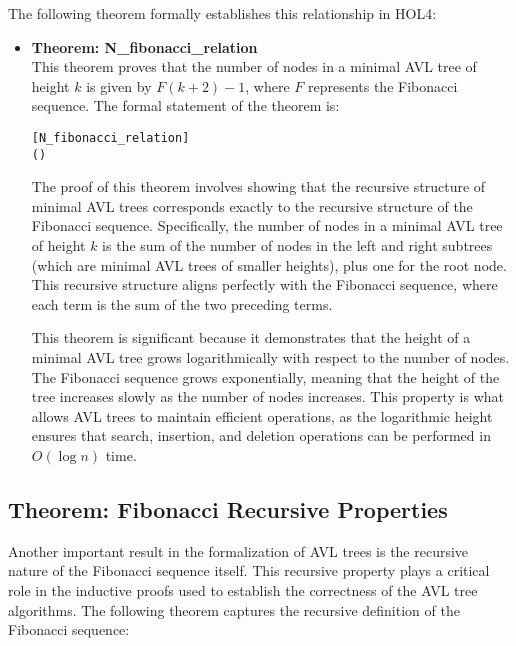 \documentclass[12pt]{article}
\begin{document}
The following theorem formally establishes this relationship in HOL4:

\begin{itemize}
  \item \textbf{Theorem: N\_fibonacci\_relation} \\
  This theorem proves that the number of nodes in a minimal AVL tree of height \( k \) is given by \( F(k+2) - 1 \), where \( F \) represents the Fibonacci sequence. The formal statement of the theorem is:

\begin{alltt}
[N_fibonacci_relation]
\HOLTokenTurnstile{}   \HOLSymConst{=}  ( \HOLSymConst{\ensuremath{+}} ) \HOLSymConst{\ensuremath{-}} 
\end{alltt}

  The proof of this theorem involves showing that the recursive structure of minimal AVL trees corresponds exactly to the recursive structure of the Fibonacci sequence. Specifically, the number of nodes in a minimal AVL tree of height \( k \) is the sum of the number of nodes in the left and right subtrees (which are minimal AVL trees of smaller heights), plus one for the root node. This recursive structure aligns perfectly with the Fibonacci sequence, where each term is the sum of the two preceding terms.

  This theorem is significant because it demonstrates that the height of a minimal AVL tree grows logarithmically with respect to the number of nodes. The Fibonacci sequence grows exponentially, meaning that the height of the tree increases slowly as the number of nodes increases. This property is what allows AVL trees to maintain efficient operations, as the logarithmic height ensures that search, insertion, and deletion operations can be performed in \( O(\log n) \) time.

\end{itemize}

\subsection{Theorem: Fibonacci Recursive Properties}

Another important result in the formalization of AVL trees is the recursive nature of the Fibonacci sequence itself. This recursive property plays a critical role in the inductive proofs used to establish the correctness of the AVL tree algorithms. The following theorem captures the recursive definition of the Fibonacci sequence:
\end{document}
